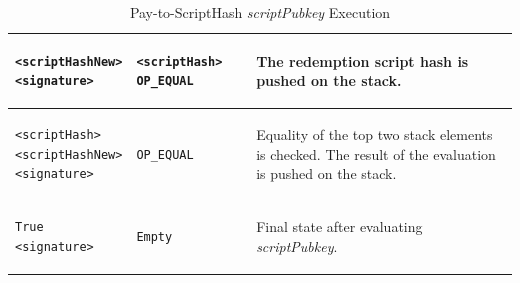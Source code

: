 \begin{table}[!ht]
\begin{minipage}{\textwidth}
\begin{tabular}{| m{105pt} | m{135pt} | m{100pt} |}
\vspace{8pt}
\begin{BVerbatim}[fontsize==\relsize{-4}]
<scriptHashNew>
<signature>
\end{BVerbatim} 
\vspace{4pt}
&
\vspace{8pt}
\begin{BVerbatim}[fontsize==\relsize{-4}]
<scriptHash> OP_EQUAL
\end{BVerbatim} 
\vspace{4pt}
&
The redemption script hash is pushed on the stack.\\ \hline


\vspace{8pt}
\begin{BVerbatim}[fontsize==\relsize{-4}]
<scriptHash>
<scriptHashNew>
<signature>
\end{BVerbatim} 
\vspace{4pt}
&
\vspace{8pt}
\begin{BVerbatim}[fontsize==\relsize{-4}]
OP_EQUAL
\end{BVerbatim} 
\vspace{4pt}
&
Equality of the top two stack elements is checked. The result of the evaluation is pushed on the stack.\\ \hline


\vspace{8pt}
\begin{BVerbatim}[fontsize==\relsize{-4}]
True
<signature>
\end{BVerbatim} 
\vspace{4pt}
&
\vspace{8pt}
\begin{BVerbatim}[fontsize==\relsize{-4}]
Empty
\end{BVerbatim} 
\vspace{4pt}
&
Final state after evaluating \textit{scriptPubkey}.\\ \hline

\end{tabular}
\vspace{5pt}
\caption{Pay-to-ScriptHash \textit{scriptPubkey} Execution}
\label{tab:P2ScriptHash2}
\end{minipage}
\end{table}

\vspace{-30pt}


